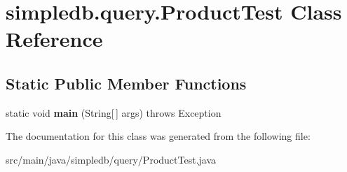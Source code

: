 \hypertarget{classsimpledb_1_1query_1_1ProductTest}{}\section{simpledb.\+query.\+Product\+Test Class Reference}
\label{classsimpledb_1_1query_1_1ProductTest}
\subsection*{Static Public Member Functions}
\begin{DoxyCompactItemize}
\item 
\mbox{\label{classsimpledb_1_1query_1_1ProductTest_a1f108a52322ab33dd5a209ebb016c5f8}} 
static void {\bfseries main} (String\mbox{[}$\,$\mbox{]} args)  throws Exception 
\end{DoxyCompactItemize}


The documentation for this class was generated from the following file\+:\begin{DoxyCompactItemize}
\item 
src/main/java/simpledb/query/Product\+Test.\+java\end{DoxyCompactItemize}
